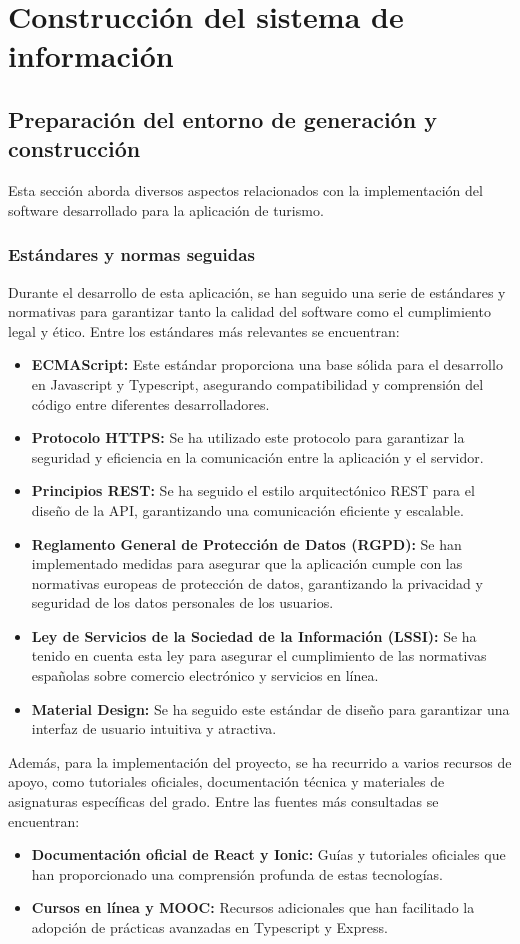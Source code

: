 \chapter{Construcción del sistema de información}
\section{Preparación del entorno de generación y construcción}
Esta sección aborda diversos aspectos relacionados con la implementación del software desarrollado para la aplicación de turismo.
\subsection{Estándares y normas seguidas}
Durante el desarrollo de esta aplicación, se han seguido una serie de estándares y normativas para garantizar tanto la calidad del software como el cumplimiento legal y ético. Entre los estándares más relevantes se encuentran:
\begin {itemize}
\item {\bfseries ECMAScript:} Este estándar proporciona una base sólida para el desarrollo en Javascript y Typescript, asegurando compatibilidad y comprensión del código entre diferentes desarrolladores.
\item {\bfseries Protocolo HTTPS:} Se ha utilizado este protocolo para garantizar la seguridad y eficiencia en la comunicación entre la aplicación y el servidor.
\item {\bfseries Principios REST:} Se ha seguido el estilo arquitectónico REST para el diseño de la API, garantizando una comunicación eficiente y escalable.
\item {\bfseries Reglamento General de Protección de Datos (RGPD):} Se han implementado medidas para asegurar que la aplicación cumple con las normativas europeas de protección de datos, garantizando la privacidad y seguridad de los datos personales de los usuarios.
\item {\bfseries Ley de Servicios de la Sociedad de la Información (LSSI):} Se ha tenido en cuenta esta ley para asegurar el cumplimiento de las normativas españolas sobre comercio electrónico y servicios en línea.
\item {\bfseries Material Design:} Se ha seguido este estándar de diseño para garantizar una interfaz de usuario intuitiva y atractiva.
\end {itemize}

Además, para la implementación del proyecto, se ha recurrido a varios recursos de apoyo, como tutoriales oficiales, documentación técnica y materiales de asignaturas específicas del grado. Entre las fuentes más consultadas se encuentran:
\begin {itemize}
\item {\bfseries Documentación oficial de React y Ionic:} Guías y tutoriales oficiales que han proporcionado una comprensión profunda de estas tecnologías.
\item {\bfseries Cursos en línea y MOOC:}  Recursos adicionales que han facilitado la adopción de prácticas avanzadas en Typescript y Express.
\end {itemize}

